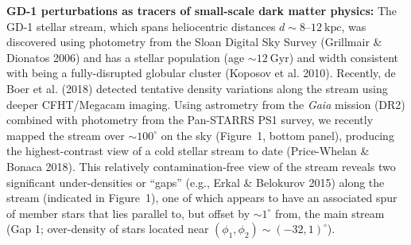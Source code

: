 \documentclass[11pt]{article}
\begin{document}
\textbf{GD-1 perturbations as tracers of small-scale dark matter physics:}
The GD-1 stellar stream, which spans heliocentric distances $d\sim 8$--$12~\textrm{kpc}$, was discovered using photometry from the Sloan Digital Sky Survey (Grillmair \& Dionatos 2006) and has a stellar population (age $\sim 12~\textrm{Gyr}$) and width consistent with being a fully-disrupted globular cluster (Koposov et al. 2010).
Recently, de Boer et al. (2018) detected tentative density variations along the stream using deeper CFHT/Megacam imaging.
Using astrometry from the \textit{Gaia} mission (DR2) combined with photometry from the Pan-STARRS PS1 survey, we recently mapped the stream over $\sim 100^\circ$ on the sky (Figure~1, bottom panel), producing the highest-contrast view of a cold stellar stream to date (Price-Whelan \& Bonaca 2018).
This relatively contamination-free view of the stream reveals two significant under-densities or ``gaps'' (e.g., Erkal \& Belokurov 2015) along the stream (indicated in Figure~1), one of which appears to have an associated spur of member stars that lies parallel to, but offset by $\sim1^\circ$ from, the main stream (Gap 1; over-density of stars located near $(\phi_1, \phi_2) \sim (-32, 1)^\circ$).
\end{document}
